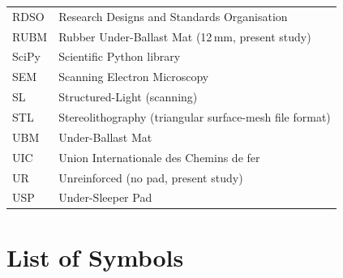 \begin{longtable}{@{}p{}>{\RaggedRight}p{}@{}}
RDSO   & Research Designs and Standards Organisation\\
RUBM   & Rubber Under-Ballast Mat (12\,mm, present study)\\
SciPy  & Scientific Python library\\
SEM    & Scanning Electron Microscopy\\
SL     & Structured-Light (scanning)\\
STL    & Stereolithography (triangular surface-mesh file format)\\
UBM    & Under-Ballast Mat\\
UIC    & Union Internationale des Chemins de fer\\
UR     & Unreinforced (no pad, present study)\\
USP    & Under-Sleeper Pad\\
\bottomrule
\end{longtable}

\chapter*{List of Symbols}

